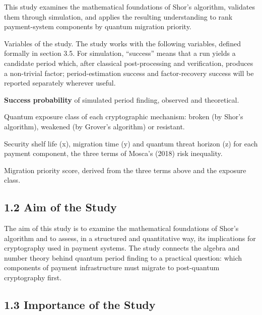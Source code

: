 \documentclass[12pt,oneside]{report}
\begin{document}
This study examines the mathematical foundations of Shor's algorithm, validates them through simulation, and applies the resulting understanding to rank payment-system components by quantum migration priority.
\par

Variables of the study. The study works with the following variables, defined formally in section 3.5. For simulation, “success” means that a run yields a candidate period which, after classical post-processing and verification, produces a non-trivial factor; period-estimation success and factor-recovery success will be reported separately wherever useful.
\par

\textbf{Success probability} of simulated period finding, observed and theoretical.
\par

Quantum exposure class of each cryptographic mechanism: broken (by Shor's algorithm), weakened (by Grover's algorithm) or resistant.
\par

Security shelf life (x), migration time (y) and quantum threat horizon (z) for each payment component, the three terms of Mosca's (2018) risk inequality.
\par

Migration priority score, derived from the three terms above and the exposure class.
\par

\subsection*{1.2 Aim of the Study}

The aim of this study is to examine the mathematical foundations of Shor's algorithm and to assess, in a structured and quantitative way, its implications for cryptography used in payment systems. The study connects the algebra and number theory behind quantum period finding to a practical question: which components of payment infrastructure must migrate to post-quantum cryptography first.
\par

\subsection*{1.3 Importance of the Study}
\end{document}
